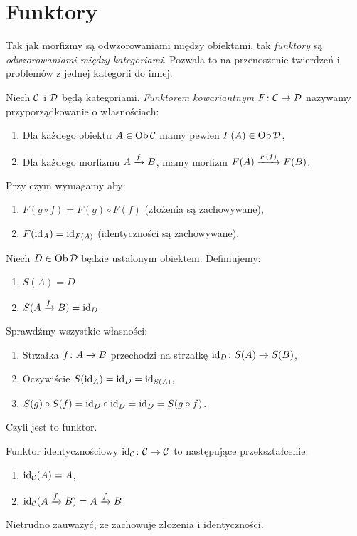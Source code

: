 \section{Funktory}
\begin{idea}
  Tak jak morfizmy są odwzorowaniami między obiektami, tak \emph{funktory} są \emph{odwzorowaniami między kategoriami}. Pozwala to na przenoszenie twierdzeń i problemów z jednej kategorii do innej.
\end{idea}

\begin{defn}
  Niech $\C$ i $\D$ będą kategoriami. \emph{Funktorem kowariantnym} $\morph F\C\D$ nazywamy przyporządkowanie o własnościach:
  \begin{enumerate}
    \item Dla każdego obiektu $A\in \Ob\C$ mamy pewien $F(A)\in \Ob\D$,
    \item Dla każdego morfizmu $\morpharr fAB$, mamy morfizm $\morpharr {F(f)}{F(A)}{F(B)}$.
  \end{enumerate}
 Przy czym wymagamy aby:
  \begin{enumerate}
    \item $F(g\circ f) = F(g)\circ F(f)$ (złożenia są zachowywane),
    \item $F(\id A) = \id{F(A)}$ (identyczności są zachowywane).
  \end{enumerate}
\end{defn}

\begin{exmp}
  Niech $D\in \Ob \D$ będzie ustalonym obiektem. Definiujemy:
  \begin{enumerate}
    \item $S(A)=D$
    \item $S(\morpharr fAB) = \id D$
  \end{enumerate}
  Sprawdźmy wszystkie własności:
  \begin{enumerate}
    \item Strzałka $\morph fAB$ przechodzi na strzałkę $\morph{\id D}{S(A)}{S(B)}$,
    \item Oczywiście $S(\id A)=\id {D} = \id {S(A)}$,
    \item $S(g)\circ S(f) = \id D\circ \id D = \id D = S(g\circ f)$.
  \end{enumerate}
  Czyli jest to funktor.
\end{exmp}

\begin{exmp}
  Funktor identycznościowy $\morph {\id \C}\C \C$ to następujące przekształcenie:
  \begin{enumerate}
    \item $\id \C(A) = A$,
    \item $\id \C(\morpharr fAB) = \morpharr fAB$
  \end{enumerate}
  Nietrudno zauważyć, że zachowuje złożenia i identyczności.
\end{exmp}

